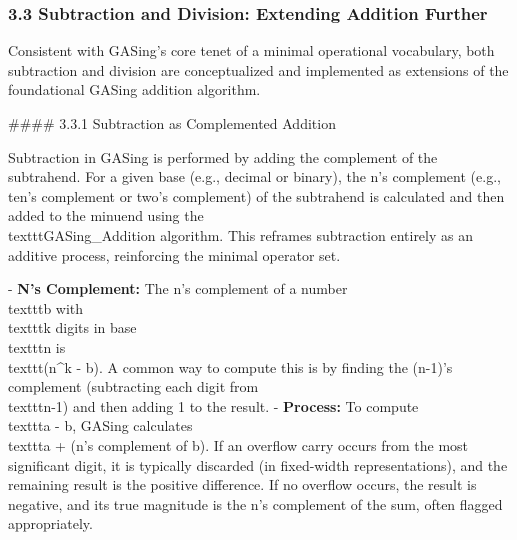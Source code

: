\subsubsection{3.3 Subtraction and Division: Extending Addition Further}

Consistent with GASing's core tenet of a minimal operational vocabulary, both subtraction and division are conceptualized and implemented as extensions of the foundational GASing addition algorithm.

\#### 3.3.1 Subtraction as Complemented Addition

Subtraction in GASing is performed by adding the complement of the subtrahend. For a given base (e.g., decimal or binary), the n's complement (e.g., ten's complement or two's complement) of the subtrahend is calculated and then added to the minuend using the \\texttt{GASing\_Addition} algorithm. This reframes subtraction entirely as an additive process, reinforcing the minimal operator set.

- \textbf{N's Complement:} The n's complement of a number \\texttt{b} with \\texttt{k} digits in base \\texttt{n} is \\texttt{(n^k - b)}. A common way to compute this is by finding the (n-1)'s complement (subtracting each digit from \\texttt{n-1}) and then adding 1 to the result.
- \textbf{Process:} To compute \\texttt{a - b}, GASing calculates \\texttt{a + (n's complement of b)}. If an overflow carry occurs from the most significant digit, it is typically discarded (in fixed-width representations), and the remaining result is the positive difference. If no overflow occurs, the result is negative, and its true magnitude is the n's complement of the sum, often flagged appropriately.


